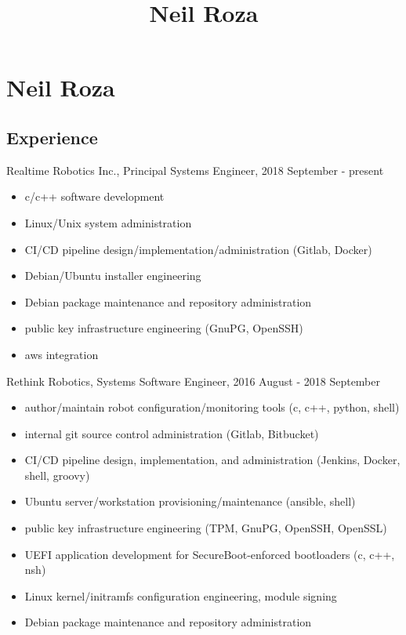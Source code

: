 \documentclass[letterpaper,11pt]{article}
\title{Neil Roza}
\begin{document}
\pagestyle{empty}

\section*{Neil Roza}



\subsection*{Experience}

Realtime Robotics Inc., Principal Systems Engineer, 2018 September - present

\begin{itemize}
\item c/c++ software development
\item Linux/Unix system administration
\item CI/CD pipeline design/implementation/administration (Gitlab, Docker)
\item Debian/Ubuntu installer engineering
\item Debian package maintenance and repository administration
\item public key infrastructure engineering (GnuPG, OpenSSH)
\item aws integration
\end{itemize}

Rethink Robotics, Systems Software Engineer, 2016 August - 2018 September

\begin{itemize}
\item author/maintain robot configuration/monitoring tools (c, c++, python,
  shell)
\item internal git source control administration (Gitlab, Bitbucket)
\item CI/CD pipeline design, implementation, and administration (Jenkins,
  Docker, shell, groovy)
\item Ubuntu server/workstation provisioning/maintenance (ansible, shell)
\item public key infrastructure engineering (TPM, GnuPG, OpenSSH, OpenSSL)
\item UEFI application development for SecureBoot-enforced bootloaders (c, c++,
  nsh)
\item Linux kernel/initramfs configuration engineering, module signing
\item Debian package maintenance and repository administration
\end{itemize}
\end{document}
